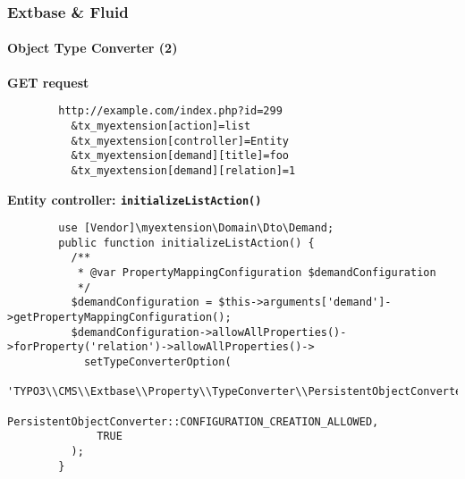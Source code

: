
\begin{frame}[fragile]
	\frametitle{Extbase \& Fluid}
	\framesubtitle{Object Type Converter (2)}

	\lstset{
		basicstyle=\tiny\ttfamily
	}

	\smaller\textbf{GET request}\normalsize
	\begin{lstlisting}
		http://example.com/index.php?id=299
		  &tx_myextension[action]=list
		  &tx_myextension[controller]=Entity
		  &tx_myextension[demand][title]=foo
		  &tx_myextension[demand][relation]=1
	\end{lstlisting}

	\smaller\textbf{Entity controller: \texttt{initializeListAction()}}\normalsize
	\begin{lstlisting}
		use [Vendor]\myextension\Domain\Dto\Demand;
		public function initializeListAction() {
		  /**
		   * @var PropertyMappingConfiguration $demandConfiguration
		   */
		  $demandConfiguration = $this->arguments['demand']->getPropertyMappingConfiguration();
		  $demandConfiguration->allowAllProperties()->forProperty('relation')->allowAllProperties()->
		    setTypeConverterOption(
		      'TYPO3\\CMS\\Extbase\\Property\\TypeConverter\\PersistentObjectConverter',
		      PersistentObjectConverter::CONFIGURATION_CREATION_ALLOWED,
		      TRUE
		  );
		}
	\end{lstlisting}

\end{frame}


